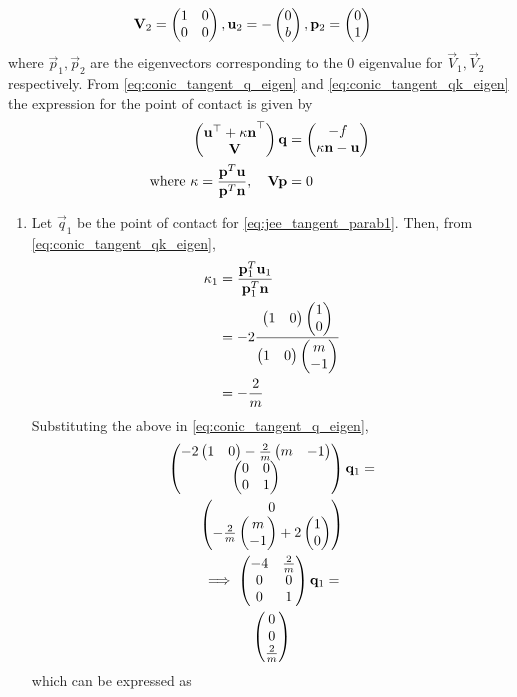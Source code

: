 \documentclass[journal,12pt,twocolumn]{IEEEtran}
\renewcommand\thesection{\arabic{section}}
\begin{document}
\begin{enumerate}[label=\thesection.\arabic*.,ref=\thesection.\theenumi]
\begin{align}
	\mathbf{V}_2 =\begin{pmatrix}1 & 0 \\ 0  & 0\end{pmatrix}, \mathbf{u}_2 = -  \begin{pmatrix}0 \\ b\end{pmatrix}, \mathbf{p}_2 &=  \begin{pmatrix}0 \\ 1\end{pmatrix}
\end{align}
where $\vec{p}_1, \vec{p}_2$ are the eigenvectors corresponding to the  0 eigenvalue for $\vec{V}_1, \vec{V}_2$ respectively.
From 
\eqref{eq:conic_tangent_q_eigen}
and 
\eqref{eq:conic_tangent_qk_eigen}
the expression for the point of contact is given by
\begin{align}
	\begin{pmatrix}
	\mathbf{\mathbf{u}^{\top}+\kappa \mathbf{n}}^{\top} \\ \mathbf{V}
\end{pmatrix}
\mathbf{q} &= 
	\begin{pmatrix}
-f
\\
\kappa\mathbf{n}-\mathbf{u}
	\end{pmatrix}
\\
\text{where }  \kappa = \frac{\mathbf{p}^T\mathbf{u}}{\mathbf{p}^T\mathbf{n}}, \quad \mathbf{V}\mathbf{p} &= 0
\end{align}
\begin{enumerate}
	\item Let $\vec{q}_1$ be the point of contact for
	\eqref{eq:jee_tangent_parab1}.  Then, from 
\eqref{eq:conic_tangent_qk_eigen},
\begin{align}
	\kappa_1 &= \frac{\mathbf{p}_1^T\mathbf{u}_1}{\mathbf{p}_1^T\mathbf{n}}
	\\
	&= -2\frac{\begin{pmatrix}1 & 0\end{pmatrix} \begin{pmatrix}1 \\ 0\end{pmatrix}}{\begin{pmatrix}1 & 0\end{pmatrix}\begin{pmatrix}m \\ -1\end{pmatrix}}
	\\
	&= -\frac{2}{m}
\end{align}
Substituting the above in 
\eqref{eq:conic_tangent_q_eigen},
\begin{multline}
	\begin{pmatrix}
		{-2\ensuremath{\begin{pmatrix}1 & 0\end{pmatrix}}-\frac{2}{m} \ensuremath{\begin{pmatrix}m & -1\end{pmatrix}}} \\ \begin{pmatrix}0 & 0 \\ 0 &  1\end{pmatrix} 
\end{pmatrix}
\mathbf{q}_1 = 
\\
	\begin{pmatrix}
		0
\\
 -\frac{2}{m} \begin{pmatrix}m \\ -1\end{pmatrix}+2\begin{pmatrix}1 \\ 0\end{pmatrix}
	\end{pmatrix}
	\\
\implies 
\begin{pmatrix}
	-4 & \frac{2}{m}  \\ 0 & 0 \\ 0 &  1
\end{pmatrix}
\mathbf{q}_1 = 
\\
\begin{pmatrix}
	0
\\
0
\\
\frac{2}{m}
\end{pmatrix}
\end{multline}
which can be expressed  as 
\begin{align}

\end{align}
\end{enumerate}
\end{enumerate}
\end{document}
